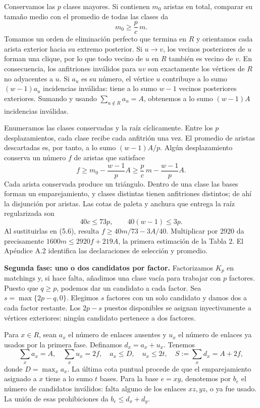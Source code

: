 \documentclass[spanish,11pt,a4paper]{article}
\begin{document}
Conservamos las \(p\) clases mayores. Si contienen \(m_0\) aristas en total, comparar su tamaño medio con el promedio de todas las clases da \[
m_0\ge\frac pc\,m.
\tag{5.5}
\] Tomamos un orden de eliminación perfecto que termina en \(R\) y orientamos cada arista exterior hacia su extremo posterior. Si \(u\to v\), los vecinos posteriores de \(u\) forman una clique, por lo que todo vecino de \(u\) en \(R\) también es vecino de \(v\). En consecuencia, los anfitriones inválidos para \(uv\) son exactamente los vértices de \(R\) no adyacentes a \(u\). Si \(a_u\) es su número, el vértice \(u\) contribuye a lo sumo \((w-1)a_u\) incidencias inválidas: tiene a lo sumo \(w-1\) vecinos posteriores exteriores. Sumando y usando \(\sum_{u\notin R}a_u=A\), obtenemos a lo sumo \((w-1)A\) incidencias inválidas.

Enumeramos las clases conservadas y la raíz cíclicamente. Entre los \(p\) desplazamientos, cada clase recibe cada anfitrión una vez. El promedio de aristas descartadas es, por tanto, a lo sumo \((w-1)A/p\). Algún desplazamiento conserva un número \(f\) de aristas que satisface \[
f\ge m_0-\frac{w-1}{p}A
\ge\frac pc\,m-\frac{w-1}{p}A.
\tag{5.6}
\] Cada arista conservada produce un triángulo. Dentro de una clase las bases forman un emparejamiento, y clases distintas tienen anfitriones distintos; de ahí la disjunción por aristas. Las cotas de paleta y anchura que entrega la raíz regularizada son \[
40c\le73p,\qquad 40(w-1)\le3p.
\tag{5.7}
\] Al sustituirlas en (5.6), resulta \(f\ge40m/73-3A/40\). Multiplicar por \(2920\) da precisamente \(1600m\le2920f+219A\), la primera estimación de la Tabla 2. El Apéndice A.2 identifica las declaraciones de selección y promedio.

\textbf{Segunda fase: uno o dos candidatos por factor.} Factorizamos \(K_p\) en matchings y, si hace falta, añadimos una clase vacía para trabajar con \(p\) factores. Puesto que \(q\ge p\), podemos dar un candidato a cada factor. Sea \(s=\max\{2p-q,0\}\). Elegimos \(s\) factores con un solo candidato y damos dos a cada factor restante. Los \(2p-s\) puestos disponibles se asignan inyectivamente a vértices exteriores: ningún candidato pertenece a dos factores.

Para \(x\in R\), sean \(a_x\) el número de enlaces ausentes y \(u_x\) el número de enlaces ya usados por la primera fase. Definamos \(d_x=a_x+u_x\). Tenemos \[
\sum_xa_x=A,\quad \sum_xu_x=2f,\quad
a_x\le D,\quad u_x\le2t,\quad
S:=\sum_xd_x=A+2f,
\tag{5.8}
\] donde \(D=\max_xa_x\). La última cota puntual procede de que el emparejamiento asignado a \(x\) tiene a lo sumo \(t\) bases. Para la base \(e=xy\), denotemos por \(b_e\) el número de candidatos inválidos: falta alguno de los enlaces \(xz,yz\), o ya fue usado. La unión de esas prohibiciones da \(b_e\le d_x+d_y\).
\end{document}
